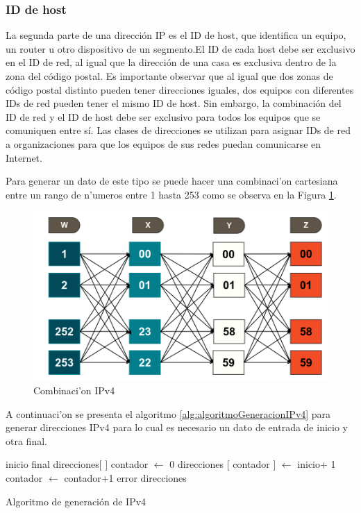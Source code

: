 \subsubsection{ID de host}
La segunda parte de una direcci\'on IP es el ID de host, que identifica un equipo, un router u otro dispositivo de un segmento.El ID de cada host debe ser exclusivo en el ID de red, al igual que la direcci\'on de una casa es exclusiva dentro de la zona del c\'odigo postal. Es importante observar que al igual que dos zonas de c\'odigo postal distinto pueden tener direcciones iguales, dos equipos con diferentes IDs de red pueden tener el mismo ID de host. Sin embargo, la combinaci\'on del ID de red y el ID de host debe ser exclusivo para todos los equipos que se comuniquen entre s\'i. Las clases de direcciones se utilizan para asignar IDs de red a organizaciones para que los equipos de sus redes puedan comunicarse en Internet.

Para generar un dato de este tipo se puede hacer una combinaci'on cartesiana entre un rango de n'umeros entre 1 hasta 253 como se observa en la Figura \ref{fig:algoritmoGeneracionIPv4}.

\begin{figure}[H]
\centering
\includegraphics[scale=0.45]{images/ipv4.png}
\caption{Combinaci'on IPv4} \label{fig:algoritmoGeneracionIPv4}
\end{figure}

A continuaci'on se presenta el algoritmo \ref{alg:algoritmoGeneracionIPv4} para generar direcciones IPv4 para lo cual es necesario un dato de entrada de inicio y otra final.
\begin{algorithm}[H]
\begin{algorithmic}[1]
\REQUIRE inicio final
\STATE direcciones$[$ $]$
\STATE contador $\leftarrow$ 0
	\STATE direcciones $[$ contador $]$ $\leftarrow$ inicio+ 1
	\STATE contador $\leftarrow$ contador+1
	\ENDWHILE
\ELSE
	\RETURN error
\ENDIF
\RETURN direcciones
\end{algorithmic}
\caption{Algoritmo de generaci\'on de IPv4}\label{alg:algoritmoGeneracionIPv4}
\end{algorithm}